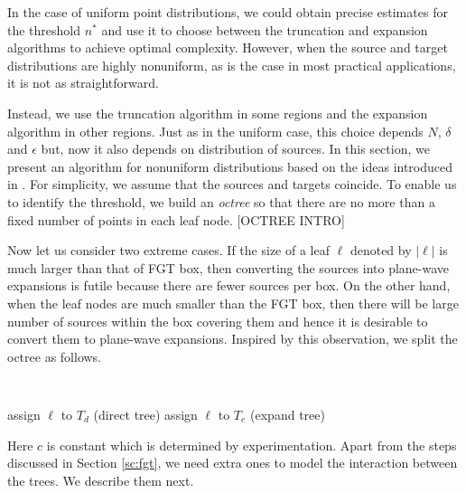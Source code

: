 
In the case of uniform point distributions, we could obtain precise estimates for the threshold $n^*$ and use it to 
 choose between the truncation and expansion algorithms to achieve optimal complexity. However, when the source and 
 target distributions are highly nonuniform, as is the case in most practical applications, it is not as
 straightforward. 
 
 Instead, we use the truncation algorithm in some regions and the expansion algorithm in other regions.  
 Just as in the uniform case, this choice depends $N$, $\delta$ and $\epsilon$ but, now it also 
 depends on distribution of sources. In this section, we present an algorithm for nonuniform distributions based on the ideas introduced in \cite{veerapaneni08}. 
For simplicity, we assume that the sources and targets coincide. To enable us to identify the threshold, we build an {\em octree} so that there are no more than a fixed number of points in each leaf node. [OCTREE INTRO]

%

Now let us consider two extreme cases. If the size of a leaf $\ell$ denoted by $|\ell|$ is much larger than that of FGT box, then converting the sources into plane-wave expansions is futile because there are fewer sources per box. On the other hand, when the leaf nodes are much smaller than the FGT box, then there will be large number of sources within the box covering them and hence it is desirable to convert them to plane-wave expansions. Inspired by this observation, we split the octree as follows. 

{\tt
\begin{algorithmic}
\STATE
          \STATE assign $\ell$ to $T_d$ (direct tree)
      \ELSE
          \STATE assign $\ell$ to $T_e$ (expand tree)
      \ENDIF
  \ENDFOR
\STATE
\end{algorithmic}
}

Here $c$ is constant which is determined by experimentation. Apart from the steps discussed in Section \ref{sc:fgt}, we need extra ones to model the interaction between the trees. We describe them next.  

